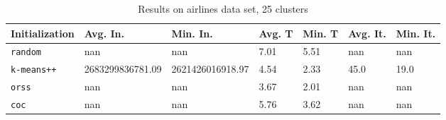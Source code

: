 \begin{table}[h]
	\begin{center}
		\begin{tabular}{|l|l|l|l|l|l|l|}
			\hline
			Initialization & Avg. In. & Min. In. & Avg. T & Min. T & Avg. It. & Min. It.\\\hline
			\texttt{random} & nan & nan & 7.01 & 5.51 & nan & nan\\\hline
			\texttt{k-means++} & 2683299836781.09 & 2621426016918.97 & 4.54 & 2.33 & 45.0 & 19.0\\\hline
			\texttt{orss} & nan & nan & 3.67 & 2.01 & nan & nan\\\hline
			\texttt{coc} & nan & nan & 5.76 & 3.62 & nan & nan\\\hline
		\end{tabular}
		\caption{Results on airlines data set, 25 clusters}
		\label{tbl:airlines25}
	\end{center}
\end{table}

